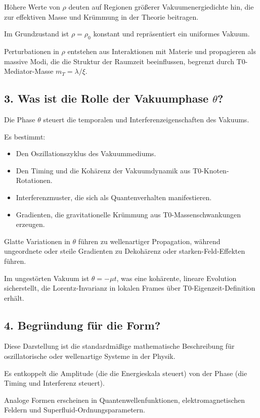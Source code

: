 	Höhere Werte von $\rho$ deuten auf Regionen größerer Vakuumenergiedichte hin, die zur effektiven Masse und Krümmung in der Theorie beitragen.
	
	Im Grundzustand ist $\rho = \rho_0$ konstant und repräsentiert ein uniformes Vakuum.
	
	Perturbationen in $\rho$ entstehen aus Interaktionen mit Materie und propagieren als massive Modi, die die Struktur der Raumzeit beeinflussen, begrenzt durch T0-Mediator-Masse $m_T = \lambda / \xi$.
	
	\subsection{3. Was ist die Rolle der Vakuumphase $\theta$?}
	
	Die Phase $\theta$ steuert die temporalen und Interferenzeigenschaften des Vakuums.
	
	Es bestimmt:
	\begin{itemize}
		\item Den Oszillationszyklus des Vakuummediums.
		\item Den Timing und die Kohärenz der Vakuumdynamik aus T0-Knoten-Rotationen.
		\item Interferenzmuster, die sich als Quantenverhalten manifestieren.
		\item Gradienten, die gravitationelle Krümmung aus T0-Massenschwankungen erzeugen.
	\end{itemize}
	
	Glatte Variationen in $\theta$ führen zu wellenartiger Propagation, während ungeordnete oder steile Gradienten zu Dekohärenz oder starken-Feld-Effekten führen.
	
	Im ungestörten Vakuum ist $\theta = -\mu t$, was eine kohärente, lineare Evolution sicherstellt, die Lorentz-Invarianz in lokalen Frames über T0-Eigenzeit-Definition erhält.
	
	\subsection{4. Begründung für die Form?}
	
	Diese Darstellung ist die standardmäßige mathematische Beschreibung für oszillatorische oder wellenartige Systeme in der Physik.
	
	Es entkoppelt die Amplitude (die die Energieskala steuert) von der Phase (die Timing und Interferenz steuert).
	
	Analoge Formen erscheinen in Quantenwellenfunktionen, elektromagnetischen Feldern und Superfluid-Ordnungsparametern.
	
